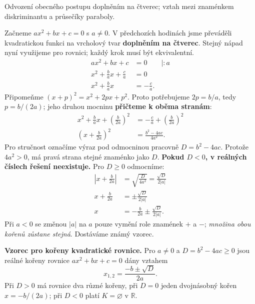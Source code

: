 \documentclass[11pt,a4paper]{article}
\begin{document}
Odvození obecného postupu doplněním na čtverec; vztah mezi znaménkem diskriminantu a průsečíky paraboly.

Začneme $ax^2+bx+c=0$ s $a\ne0$. V předchozích hodinách jsme
převáděli kvadratickou funkci na vrcholový tvar \textbf{doplněním na čtverec}.
Stejný nápad nyní využijeme pro rovnici; každý krok musí být ekvivalentní.
\[
\begin{aligned}
ax^2+bx+c&=0\qquad\big|:a\\
x^2+\frac ba x+\frac ca&=0\\
x^2+\frac ba x&=-\frac ca.
\end{aligned}
\]
Připomeňme $(x+p)^2=x^2+2px+p^2$. Proto potřebujeme $2p=b/a$,
tedy $p=b/(2a)$; jeho druhou mocninu \textbf{přičteme k oběma stranám}:
\[
\begin{aligned}
x^2+\frac ba x+\left(\frac{b}{2a}\right)^2
  &=-\frac ca+\left(\frac{b}{2a}\right)^2\\
\left(x+\frac b{2a}\right)^2
  &=\frac{b^2-4ac}{4a^2}.
\end{aligned}
\]
Pro stručnost označíme výraz pod odmocninou pracovně $D=b^2-4ac$. Protože $4a^2>0$, má pravá strana stejné znaménko jako $D$.
\textbf{Pokud $D<0$, v reálných číslech řešení neexistuje.} Pro $D\ge0$ odmocníme:
\[
\begin{aligned}
\left|x+\frac b{2a}\right|&=\sqrt{\frac D{4a^2}}
      =\frac{\sqrt D}{2|a|}\\
x+\frac b{2a}&=\pm\frac{\sqrt D}{2|a|}\\
x&=-\frac b{2a}\pm\frac{\sqrt D}{2|a|}.
\end{aligned}
\]
Při $a<0$ se změnou $|a|$ na $a$ pouze vymění role znamének $+$ a $-$;
\emph{množina obou kořenů zůstane stejná}. Dostáváme známý vzorec.
\begin{definiceBox}[title={Věta - Vzorec pro kořeny kvadratické rovnice}]
\textbf{Vzorec pro kořeny kvadratické rovnice.} Pro $a\ne0$ a $D=b^2-4ac\ge0$
jsou reálné kořeny rovnice $ax^2+bx+c=0$ dány vztahem
\[
  x_{1,2}=\frac{-b\pm\sqrt D}{2a}.
\]
Při $D>0$ má rovnice dva různé kořeny, při $D=0$ jeden dvojnásobný kořen
$x=-b/(2a)$; při $D<0$ platí $K=\varnothing$ v $\mathbb R$.
\end{definiceBox}
\end{document}
